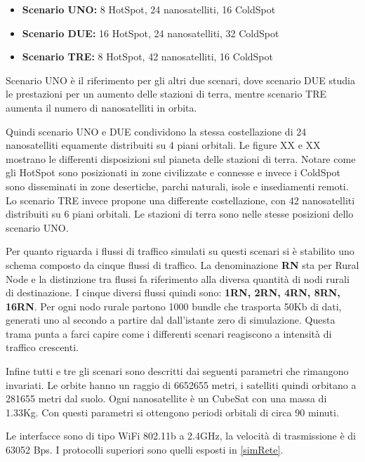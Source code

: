 \documentclass[12pt,a4paper,oneside]{book}
\begin{document}
		\begin{itemize}
			\item {\bf Scenario UNO:} 8 HotSpot, 24 nanosatelliti, 16 ColdSpot
			\item {\bf Scenario DUE:} 16 HotSpot, 24 nanosatelliti, 32 ColdSpot
			\item {\bf Scenario TRE:} 8 HotSpot, 42 nanosatelliti, 16 ColdSpot
		\end{itemize}
		
		Scenario UNO è il riferimento per gli altri due scenari, dove scenario DUE studia le prestazioni per un aumento delle stazioni di terra, mentre scenario TRE aumenta il numero di nanosatelliti in orbita.
		
		
		Quindi scenario UNO e DUE condividono la stessa costellazione di 24 nanosatelliti equamente distribuiti su 4 piani orbitali. Le figure XX e XX mostrano le differenti disposizioni sul pianeta delle stazioni di terra. Notare come gli HotSpot sono posizionati in zone civilizzate e connesse e invece i ColdSpot sono disseminati in zone desertiche, parchi naturali, isole e insediamenti remoti. 
		Lo scenario TRE invece propone una differente costellazione, con 42 nanosatelliti distribuiti su 6 piani orbitali. Le stazioni di terra sono nelle stesse posizioni dello scenario UNO.
		
		Per quanto riguarda i flussi di traffico simulati su questi scenari si è stabilito uno schema composto da cinque flussi di traffico. La denominazione {\bf RN} sta per Rural Node e la distinzione tra flussi fa riferimento alla diversa quantità di nodi rurali di destinazione. I cinque diversi flussi quindi sono: {\bf 1RN, 2RN, 4RN, 8RN, 16RN}. Per ogni nodo rurale partono 1000 bundle che trasporta 50Kb di dati, generati uno al secondo a partire dal dall'istante zero di simulazione. Questa trama punta a farci capire come i differenti scenari reagiscono a intensità di traffico crescenti.
		
		Infine tutti e tre gli scenari sono descritti dai seguenti parametri che rimangono invariati. Le orbite hanno un raggio di 6652655 metri, i satelliti quindi orbitano a 281655 metri dal suolo. Ogni nanosatellite è un CubeSat con una massa di 1.33Kg. Con questi parametri si ottengono periodi orbitali di circa 90 minuti.
		
		Le interfacce sono di tipo WiFi 802.11b a 2.4GHz, la velocità di trasmissione è di 63052 Bps. I protocolli superiori sono quelli esposti in \ref{simRete}.
		
\end{document}
